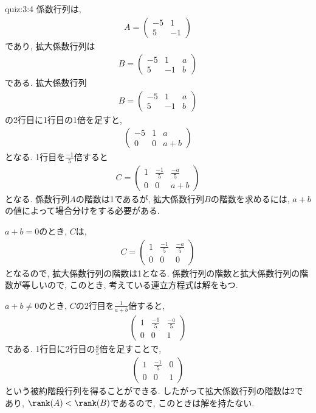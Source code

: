 \begin{answerof}{quiz:3:4}
  係数行列は,
  \begin{align*}
    A=\begin{pmatrix}-5&1\\5&-1\end{pmatrix}
  \end{align*}
  であり,
  拡大係数行列は
  \begin{align*}
    B=\begin{pmatrix}-5&1&a\\5&-1&b\end{pmatrix}
  \end{align*}
  である.
  拡大係数行列
  \begin{align*}
    B=\begin{pmatrix}-5&1&a\\5&-1&b\end{pmatrix}
  \end{align*}
  の2行目に1行目の1倍を足すと,
  \begin{align*}
    \begin{pmatrix}-5&1&a\\0&0&a+b\end{pmatrix}
  \end{align*}
  となる. 1行目を$\frac{-1}{5}$倍すると
  \begin{align*}
    C=\begin{pmatrix}1&\frac{-1}{5}&\frac{-a}{5}\\0&0&a+b\end{pmatrix}
  \end{align*}
  となる.
  係数行列$A$の階数は1であるが,
  拡大係数行列$B$の階数を求めるには,
  $a+b$の値によって場合分けをする必要がある.

  $a+b=0$のとき,
  $C$は,
  \begin{align*}
    C=\begin{pmatrix}1&\frac{-1}{5}&\frac{-a}{5}\\0&0&0\end{pmatrix}
  \end{align*}
  となるので, 拡大係数行列の階数は1となる.
  係数行列の階数と拡大係数行列の階数が等しいので,
  このとき, 考えている連立方程式は解をもつ.

  $a+b\neq 0$のとき,
    $C$の2行目を$\frac{1}{a+b}$倍すると,
  \begin{align*}
    \begin{pmatrix}1&\frac{-1}{5}&\frac{-a}{5}\\0&0&1\end{pmatrix}
  \end{align*}
  である.
  1行目に2行目の$\frac{a}{5}$倍を足すことで,
  \begin{align*}
    \begin{pmatrix}1&\frac{-1}{5}&0\\0&0&1\end{pmatrix}
  \end{align*}
  という被約階段行列を得ることができる.
  したがって拡大係数行列の階数は2であり,
  $\rank(A)<\rank(B)$であるので,
  このときは解を持たない.
\end{answerof}


